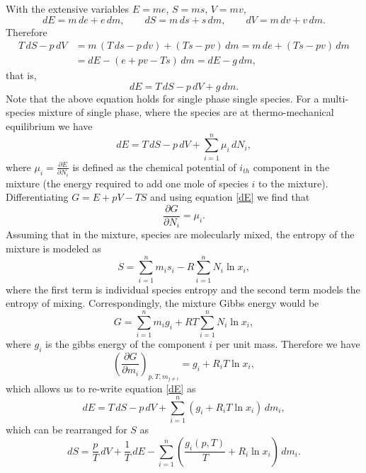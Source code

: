 With the extensive variables $E=me$, $S=ms$,
$V=mv$,
\begin{equation}
d E=m\,d e+e\,d m,\qquad d S=m\,d s+s\,d m,\qquad d V=m\,d v+v\,d m .
\end{equation}
Therefore
\begin{align}
T\,d S-p\,d V&=m\,(T\,d s-p\,d v)+(Ts-pv)\,d m=m\,d e+(Ts-pv)\,d m\nonumber\\
&=d E-(e+pv-Ts)\,d m=d E-g\,d m,
\end{align}
that is,
\begin{equation}
d E=T\,d S-p\,d V+g\,d m.
\end{equation}
Note that the above equation holds for single phase single species. For a multi-species mixture of single phase, where the species are at thermo-mechanical equilibrium we have
\begin{equation}\label{dE}
d E=T\,d S-p\,d V+\sum_{i=1}^{n} \mu_i \, d N_i,
\end{equation}
where $\mu_i = \frac{\partial E}{\partial N_i}$ is defined as the chemical potential of $i_{th}$ component in the mixture (the energy required to add one mole of species $i$ to the mixture). Differentiating $G=E+pV-TS$ and using equation \eqref{dE} we find that 
\begin{equation}
\frac{\partial G}{\partial N_i} = \mu_i.
\end{equation}
Assuming that in the mixture, species are molecularly mixed, the entropy of the mixture is modeled as
\begin{equation}
    S = \sum_{i=1}^{n} m_i s_i - R \sum_{i=1}^{n} N_i \ln{x_i},
\end{equation}
where the first term is individual species entropy and the second term models the entropy of mixing. Correspondingly, the mixture Gibbs energy would be
\begin{equation}
    G = \sum_{i=1}^{n} m_i g_i + R T \sum_{i=1}^{n} N_i \ln{x_i},
\end{equation}
where $g_i$ is the gibbs energy of the component $i$ per unit mass. Therefore we have
\begin{equation}
   \left( \frac{\partial G}{\partial m_i} \right)_{p,T,m_{j \ne i}} = g_i + R_i T \ln{x_i},
\end{equation}
which allows us to re-write equation \eqref{dE} as
\begin{equation}
    d E=T\,d S-p\,d V+\sum_{i=1}^{n} \left( g_i + R_i T \ln{x_i} \right) \, d m_i,
\end{equation}
which can be rearranged for $S$ as
\begin{equation}\label{dS}
d S = \frac pT\,d V + \frac1T\,d E - \sum_{i=1}^{n} \left( \frac{g_i(p,T)}{T} + R_i \ln{x_i} \right) \,d m_i.
\end{equation}
